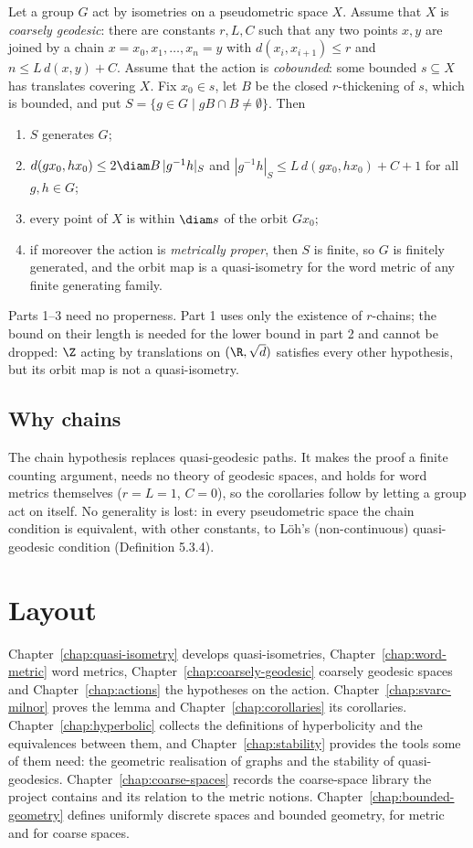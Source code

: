 Let a group $G$ act by isometries on a pseudometric space $X$. Assume that $X$ is
\emph{coarsely geodesic}: there are constants $r, L, C$ such that any two points $x, y$ are joined
by a chain $x = x_0, x_1, \dots, x_n = y$ with $d(x_i, x_{i+1}) \le r$ and $n \le L\,d(x, y) + C$.
Assume that the action is \emph{cobounded}: some bounded $s \subseteq X$ has translates covering
$X$. Fix $x_0 \in s$, let $B$ be the closed $r$-thickening of $s$, which is bounded, and put
$S = \{g \in G \mid g B \cap B \ne \emptyset\}$. Then
\begin{enumerate}
  \item $S$ generates $G$;
  \item $d(g x_0, h x_0) \le 2 \diam B\,|g^{-1}h|_S$ and
        $|g^{-1}h|_S \le L\,d(g x_0, h x_0) + C + 1$ for all $g, h \in G$;
  \item every point of $X$ is within $\diam s$ of the orbit $G x_0$;
  \item if moreover the action is \emph{metrically proper}, then $S$ is finite, so $G$ is
        finitely generated, and the orbit map is a quasi-isometry for the word metric of any
        finite generating family.
\end{enumerate}
Parts 1--3 need no properness. Part 1 uses only the existence of $r$-chains; the bound on their
length is needed for the lower bound in part 2 and cannot be dropped: $\Z$ acting by
translations on $(\R, \sqrt{d})$ satisfies every other hypothesis, but its orbit map is not a
quasi-isometry.

\subsection*{Why chains}

The chain hypothesis replaces quasi-geodesic paths. It makes the proof a finite counting
argument, needs no theory of geodesic spaces, and holds for word metrics themselves ($r = L = 1$,
$C = 0$), so the corollaries follow by letting a group act on itself. No generality is lost: in
every pseudometric space the chain condition is equivalent, with other constants, to L\"oh's
(non-continuous) quasi-geodesic condition (Definition 5.3.4).

\section*{Layout}

Chapter~\ref{chap:quasi-isometry} develops quasi-isometries,
Chapter~\ref{chap:word-metric} word metrics, Chapter~\ref{chap:coarsely-geodesic} coarsely
geodesic spaces and Chapter~\ref{chap:actions} the hypotheses on the action.
Chapter~\ref{chap:svarc-milnor} proves the lemma and Chapter~\ref{chap:corollaries} its
corollaries. Chapter~\ref{chap:hyperbolic} collects the definitions of hyperbolicity and the
equivalences between them, and Chapter~\ref{chap:stability} provides the tools some of them need:
the geometric realisation of graphs and the stability of quasi-geodesics.
Chapter~\ref{chap:coarse-spaces} records the coarse-space library the project contains and its
relation to the metric notions.
Chapter~\ref{chap:bounded-geometry} defines uniformly discrete spaces and bounded geometry, for
metric and for coarse spaces.
